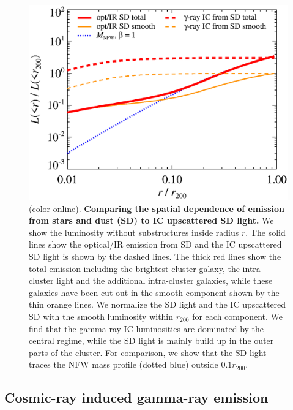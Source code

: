 \documentclass[10pt,aps,pra,reprint,amsmath,amsfonts,amssymb,showpacs,nofootinbib,floatfix]{revtex4-1}
\def\del#1{{}}
\def\C#1{{\bf #1}}
\newcommand{\colo}{(color online). }
\newcommand{\rvir}{r_{200}}
\begin{document}
\begin{figure}%
 \includegraphics[width=0.99\columnwidth]{figures/lum.stars.bw.eps}
 \caption{\colo \C{Comparing the spatial dependence of
     emission from stars and dust (SD) to IC upscattered SD light.}
   \del{Accumulative luminosity as a function of radius.}  We show the
   luminosity without substructures inside radius $r$. The solid lines
   show the optical/IR emission from SD and the IC upscattered SD
   light is shown by the dashed lines. The thick red lines show the
   total emission including the brightest cluster galaxy, the
   intra-cluster light and the additional intra-cluster galaxies,
   while these galaxies have been cut out in the smooth component
   shown by the thin orange lines. We normalize the SD light and the
   IC upscattered SD with the smooth luminosity within $\rvir$ for
   each component. We find that the gamma-ray IC luminosities are
   dominated by the central regime, while the SD light is mainly build
   up in the outer parts of the cluster. For comparison, we show that
   the SD light traces the NFW mass profile (dotted blue) outside
   $0.1\rvir$.}
 \label{fig:SD_lum}
\end{figure}


\subsection{Cosmic-ray induced gamma-ray emission}
\label{sect:CRs}
\end{document}

